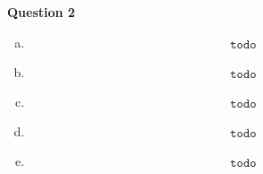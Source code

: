 \documentclass[11pt]{article}
\def\code#1{\texttt{#1}}
\begin{document}
\item[] \textbf{Question 2}

  \begin{enumerate}[a.]

    \item
      \begin{equation*}
      \begin{aligned}
				\code{todo}
      \end{aligned}
      \end{equation*}

    \item 
      \begin{equation*}
      \begin{aligned}
				\code{todo}
      \end{aligned}
      \end{equation*}

    \item
      \begin{equation*}
      \begin{aligned}
				\code{todo}
      \end{aligned}
      \end{equation*}

    \item
      \begin{equation*}
      \begin{aligned}
				\code{todo}
      \end{aligned}
      \end{equation*}

    \item
      \begin{equation*}
      \begin{aligned}
				\code{todo}
      \end{aligned}
      \end{equation*}

  \end{enumerate}
\end{document}
